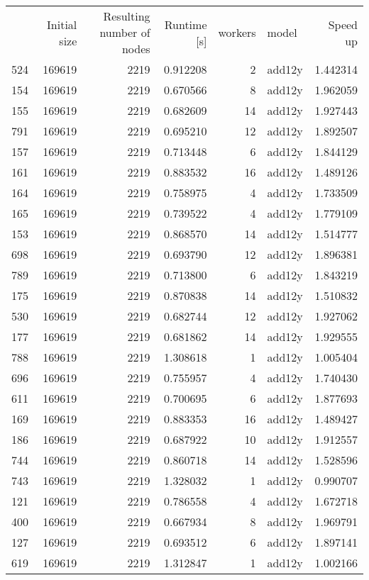 \begin{tabular}{lrrrrlr}
 & Initial size & Resulting number of nodes & Runtime [s] & workers & model & Speed up \\
524 & 169619 & 2219 & 0.912208 & 2 & add12y & 1.442314 \\
154 & 169619 & 2219 & 0.670566 & 8 & add12y & 1.962059 \\
155 & 169619 & 2219 & 0.682609 & 14 & add12y & 1.927443 \\
791 & 169619 & 2219 & 0.695210 & 12 & add12y & 1.892507 \\
157 & 169619 & 2219 & 0.713448 & 6 & add12y & 1.844129 \\
161 & 169619 & 2219 & 0.883532 & 16 & add12y & 1.489126 \\
164 & 169619 & 2219 & 0.758975 & 4 & add12y & 1.733509 \\
165 & 169619 & 2219 & 0.739522 & 4 & add12y & 1.779109 \\
153 & 169619 & 2219 & 0.868570 & 14 & add12y & 1.514777 \\
698 & 169619 & 2219 & 0.693790 & 12 & add12y & 1.896381 \\
789 & 169619 & 2219 & 0.713800 & 6 & add12y & 1.843219 \\
175 & 169619 & 2219 & 0.870838 & 14 & add12y & 1.510832 \\
530 & 169619 & 2219 & 0.682744 & 12 & add12y & 1.927062 \\
177 & 169619 & 2219 & 0.681862 & 14 & add12y & 1.929555 \\
788 & 169619 & 2219 & 1.308618 & 1 & add12y & 1.005404 \\
696 & 169619 & 2219 & 0.755957 & 4 & add12y & 1.740430 \\
611 & 169619 & 2219 & 0.700695 & 6 & add12y & 1.877693 \\
169 & 169619 & 2219 & 0.883353 & 16 & add12y & 1.489427 \\
186 & 169619 & 2219 & 0.687922 & 10 & add12y & 1.912557 \\
744 & 169619 & 2219 & 0.860718 & 14 & add12y & 1.528596 \\
743 & 169619 & 2219 & 1.328032 & 1 & add12y & 0.990707 \\
121 & 169619 & 2219 & 0.786558 & 4 & add12y & 1.672718 \\
400 & 169619 & 2219 & 0.667934 & 8 & add12y & 1.969791 \\
127 & 169619 & 2219 & 0.693512 & 6 & add12y & 1.897141 \\
619 & 169619 & 2219 & 1.312847 & 1 & add12y & 1.002166 \\

\end{tabular}
